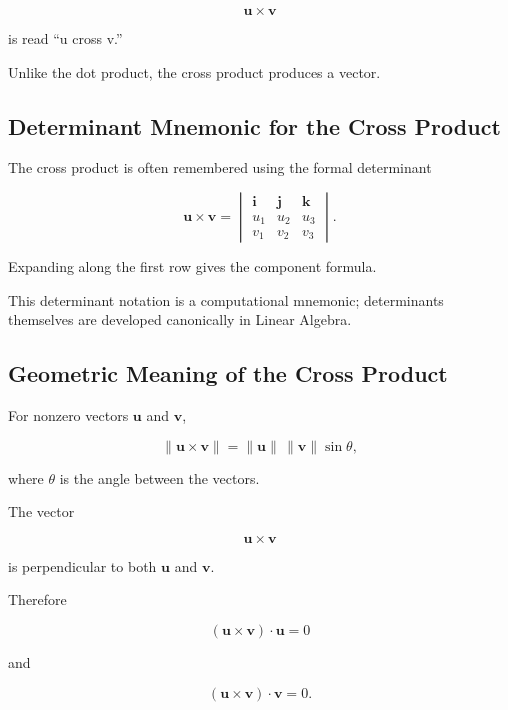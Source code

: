 \[ \mathbf{u}\times\mathbf{v} \]

is read ``u cross v.''

Unlike the dot product, the cross product produces a vector.

\subsection{Determinant Mnemonic for the Cross Product}
\label{subsec:cross-product-determinant}

The cross product is often remembered using the formal determinant

\[
\boxed{
\mathbf{u}\times\mathbf{v}
=
\begin{vmatrix}
\mathbf{i}&\mathbf{j}&\mathbf{k}\\
u_1&u_2&u_3\\
v_1&v_2&v_3
\end{vmatrix}.
}
\]

Expanding along the first row gives the component formula.

This determinant notation is a computational mnemonic; determinants
themselves are developed canonically in Linear Algebra.

\subsection{Geometric Meaning of the Cross Product}
\label{subsec:cross-product-geometric-meaning}

For nonzero vectors \(\mathbf{u}\) and \(\mathbf{v}\),

\[
\boxed{
\|\mathbf{u}\times\mathbf{v}\|
=
\|\mathbf{u}\|\,\|\mathbf{v}\|\sin\theta,
}
\]

where \(\theta\) is the angle between the vectors.

The vector

\[ \mathbf{u}\times\mathbf{v} \]

is perpendicular to both \(\mathbf{u}\) and \(\mathbf{v}\).

Therefore

\[
(\mathbf{u}\times\mathbf{v})\cdot\mathbf{u}=0
\]

and

\[
(\mathbf{u}\times\mathbf{v})\cdot\mathbf{v}=0.
\]

